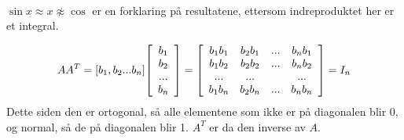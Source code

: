 \documentclass[11pt, a4paper, norsk]{NTNUoving}
\newenvironment{pkt}{\begin{punkt}}{\end{punkt}}
\newenvironment{matrise}[1][c]{
        \left[
            \begin{array}{#1}
    }
    {    
    \end{array}
    \right]           
}
\begin{document}
\begin{oppgave}
\begin{pkt}
\begin{align*}
        \end{align*}
    \end{pkt}
    \begin{pkt}
        
        $\sin x \approx x \not\approx \cos$ er en forklaring på resultatene, ettersom indreproduktet her er et integral.
        \end{pkt}
\end{oppgave}
\begin{oppgave}
    \begin{align*}
        AA^T=[b_1, b_2...b_n]\begin{matrise}
        b_1\\b_2\\...\\b_n
        \end{matrise}
        =\begin{matrise}[cccc]
            b_1b_1&b_2b_1&...&b_nb_1\\
            b_1b_2&b_2b_2&...&b_nb_2\\
            ...&... & &...\\
            b_1b_n&b_2b_n &... &b_nb_n
        \end{matrise}
        =I_n
    \end{align*}
    Dette siden den er ortogonal, så alle elementene som ikke er på diagonalen blir 0, og normal, så de på diagonalen blir 1. $A^T$ er da den inverse av $A$.
\end{oppgave}
\end{document}

